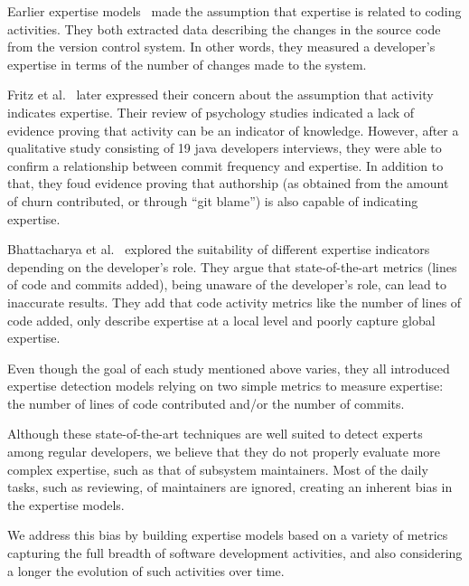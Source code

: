 Earlier expertise models~\cite{McDonald,mockus02} made the assumption that expertise is related to coding activities. They both extracted data describing the changes in the source code from the version control system. In other words, they measured a developer's expertise in terms of the number of changes made to the system.

Fritz et al.~\cite{Fritz-2007} later expressed their concern about the assumption that activity indicates expertise. Their review of psychology studies indicated a lack of evidence proving that activity can be an indicator of knowledge. However, after a qualitative study consisting of  19 java developers interviews, they were able to confirm a relationship between commit frequency and expertise. In addition to that, they foud evidence proving that authorship (as obtained from the amount of churn contributed, or through ``git blame'') is also capable of indicating expertise.

Bhattacharya et al.~\cite{Bhattacharya} explored the suitability of different expertise indicators depending on the developer's role. They argue that state-of-the-art metrics (lines of code and commits added), being unaware of the developer's role, can lead to inaccurate results. They add that code activity metrics like the number of lines of code added, only describe expertise at a local level and poorly capture global expertise. 

Even though the goal of each study mentioned above varies, they all introduced expertise detection models relying on two simple metrics to measure expertise: the number of lines of code contributed and/or the number of commits.

Although these state-of-the-art techniques are well suited to detect experts among regular developers, we believe that they do not properly evaluate more complex expertise, such as that of subsystem maintainers. Most of the daily tasks, such as reviewing, of maintainers are ignored, creating an inherent bias in the expertise models.

We address this bias by building expertise models based on a variety of metrics capturing the full breadth of software development activities, and also considering a longer the evolution of such activities over time.%








